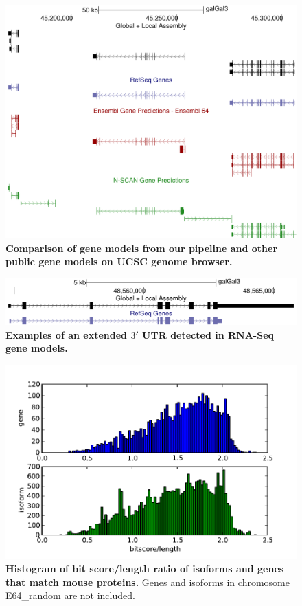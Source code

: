 \documentclass[10pt]{article}
\begin{document}
\begin{figure}[!ht]
\begin{center}
\includegraphics[width=5in]{model_comparisons.pdf}
\end{center}
\caption{
{\bf Comparison of gene models from our pipeline and other public gene models on UCSC genome browser.}
}
\label{model_comparisons}
\end{figure}

\begin{figure}[!ht]
\begin{center}
\includegraphics[width=5in]{long_utr.pdf}
\end{center}
\caption{
{\bf Examples of an extended $3'$ UTR detected in RNA-Seq gene models.}
}
\label{long_utr}
\end{figure}

\begin{figure}[!ht]
\begin{center}
\includegraphics[width=5in]{bitscore.pdf}
\end{center}
\caption{
{\bf Histogram of bit score/length ratio of isoforms and genes that match mouse proteins.}
Genes and isoforms in chromosome E64\_random are not included.
}
\label{bitscore}
\end{figure}
\end{document}
